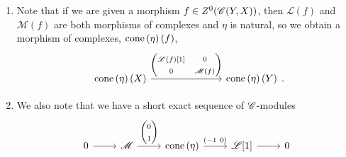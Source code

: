 \documentclass[dissertation.tex]{subfiles}
\begin{document}
\begin{rmk}
  \begin{enumerate}
  \item
    Note that if we are given a morphism $f \in Z^0(\mathscr{C}(Y,X))$, then $\mathscr{L}(f)$ and $\mathscr{M}(f)$ are both morphisms of complexes and $\eta$ is natural, so we obtain a morphism of complexes, $\operatorname{cone}\left(\eta\right)(f)$,
    $$\begin{tikzcd}[ampersand replacement=\&]
      \cone{\eta}(X) \arrow{rrr}{\left(\begin{matrix}\mathscr{L}(f)[1] & 0\\0 & \mathscr{M}(f)\end{matrix}\right)} \&\&\& \cone{\eta}(Y)
    \end{tikzcd}.$$
  \item
    We also note that we have a short exact sequence of $\mathscr{C}$-modules
    $$\begin{tikzcd}
      0 \arrow{r} & \mathscr{M} \arrow{r}{\left(\begin{matrix}0\\1\end{matrix}\right)} & \cone{\eta} \arrow{r}{\left(-1\ 0\right)} & \mathscr{L}[1] \arrow{r} & 0
    \end{tikzcd}$$
  \end{enumerate}
\end{rmk}
\end{document}
